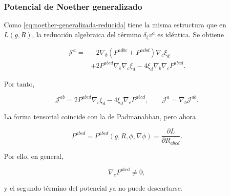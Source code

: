 \documentclass{beamer}
\newcommand{\Eq}[1]{\eqref{#1}}
\newcommand{\CompactDisplaySpacing}{%
  \setlength{\abovedisplayskip}{2pt plus 1pt minus 1pt}%
  \setlength{\belowdisplayskip}{2pt plus 1pt minus 1pt}%
  \setlength{\abovedisplayshortskip}{0pt plus 1pt}%
  \setlength{\belowdisplayshortskip}{1pt plus 1pt}%
}
\begin{document}
\begin{frame}[label=nav-frame-085]
	\frametitle{Potencial de Noether generalizado}
\linespread{.96}\selectfont\CompactDisplaySpacing
	\small

	Como \Eq{eq:noether-generalizada-reducida} tiene la misma
	estructura que en \(L(g,R)\), la reducción algebraica del término
	\(\delta_\xi v^a\) es idéntica. Se obtiene

	\[
	\boxed{
		\begin{aligned}
			\mathcal J^a
			={}&
			-2\nabla_b
			\left(
			P^{adbc}+P^{acbd}
			\right)\nabla_c\xi_d
			\\
			&+
			2P^{abcd}\nabla_b\nabla_c\xi_d
			-
			4\xi_d\nabla_b\nabla_cP^{abcd}.
		\end{aligned}
	}
	\]

	Por tanto,

	\begin{equation}
		\boxed{
			\mathcal J^{ab}
			=
			2P^{abcd}\nabla_c\xi_d
			-
			4\xi_d\nabla_cP^{abcd},
			\qquad
			\mathcal J^a=\nabla_b\mathcal J^{ab}.
		}
		\label{eq:noether-potential-generalizado}
	\end{equation}

	La forma tensorial coincide con la de Padmanabhan, pero ahora

	\[
	\boxed{
		P^{abcd}
		=
		P^{abcd}(g,R,\phi,\nabla\phi)
		=
		\frac{\partial L}
		{\partial R_{abcd}}.
	}
	\]

	Por ello, en general,

	\[
	\nabla_cP^{abcd}
	\neq0,
	\]

	y el segundo término del potencial ya no puede descartarse.

\end{frame}
\end{document}
